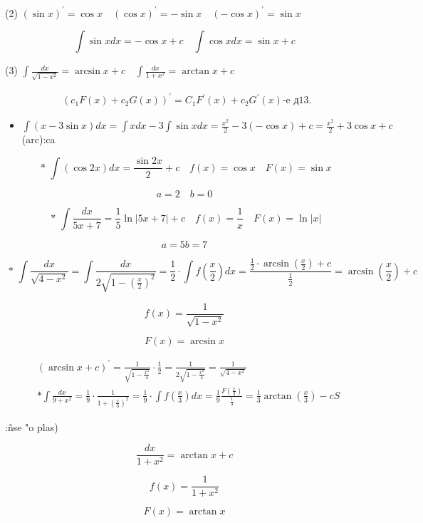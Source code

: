 \documentclass[10pt]{article}
\begin{document}
(2) $(\sin x)^{\prime}=\cos x \quad(\cos x)^{\prime}=-\sin x \quad(-\cos x)^{\prime}=\sin x$

$$
\int \sin x d x=-\cos x+c \quad \int \cos x d x=\sin x+c
$$

(3) $\int \frac{d x}{\sqrt{1-x^{2}}}=\arcsin x+c \quad \int \frac{d x}{1+x^{2}}=\arctan x+c$

$$
\begin{aligned}
& \left(c_{1} F(x)+c_{2} G(x)\right)^{\prime}=C_{1} F^{\prime}(x)+c_{2} G^{\prime}(x) \text {-e д13. }
\end{aligned}
$$

\begin{itemize}
  \item $\int(x-3 \sin x) d x=\int x d x-3 \int \sin x d x=\frac{x^{2}}{2}-3(-\cos x)+c=\frac{x^{2}}{2}+3 \cos x+c$ (arc):ca
\end{itemize}

$$
\text { * } \int(\cos 2 x) d x=\frac{\sin 2 x}{2}+c \quad f(x)=\cos x \quad F(x)=\sin x
$$

$$
a=2 \quad b=0
$$

$$
\text { * } \int \frac{d x}{5 x+7}=\frac{1}{5} \ln |5 x+7|+c \quad f(x)=\frac{1}{x} \quad F(x)=\ln |x|
$$

$$
a=5 b=7
$$

$$
\text { * } \int \frac{d x}{\sqrt{4-x^{2}}}=\int \frac{d x}{2 \sqrt{1-\left(\frac{x}{2}\right)^{2}}}=\frac{1}{2} \cdot \int f\left(\frac{x}{2}\right) d x=\frac{\frac{1}{2} \cdot \arcsin \left(\frac{x}{2}\right)+c}{\frac{1}{2}}=\arcsin \left(\frac{x}{2}\right)+c
$$

$$
f(x)=\frac{1}{\sqrt{1-x^{2}}}
$$

$$
F(x)=\arcsin x
$$

$$
\begin{aligned}
& (\arcsin x+c)^{\prime}=\frac{1}{\sqrt{1-\frac{x^{2}}{4}}} \cdot \frac{1}{2}=\frac{1}{2 \sqrt{1-\frac{x^{2}}{4}}}=\frac{1}{\sqrt{4-x^{2}}} \\
& * \int \frac{d x}{9+x^{2}}=\frac{1}{9} \cdot \frac{1}{1+\left(\frac{x}{3}\right)^{2}}=\frac{1}{9} \cdot \int f\left(\frac{x}{3}\right) d x=\frac{1}{9} \frac{F\left(\frac{x}{3}\right)}{\frac{1}{3}}=\frac{1}{3} \arctan \left(\frac{x}{3}\right)-c S
\end{aligned}
$$

:ñse "o plas)

$$
\frac{d x}{1+x^{2}}=\arctan x+c
$$

$$
f(x)=\frac{1}{1+x^{2}}
$$

$$
F(x)=\arctan x
$$
\end{document}
